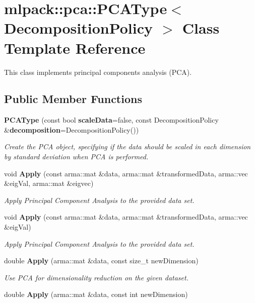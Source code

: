 \section{mlpack\+:\+:pca\+:\+:P\+C\+A\+Type$<$ Decomposition\+Policy $>$ Class Template Reference}
\label{classmlpack_1_1pca_1_1PCAType}


This class implements principal components analysis (P\+CA).  


\subsection*{Public Member Functions}
\begin{DoxyCompactItemize}
\item 
{\bf P\+C\+A\+Type} (const bool {\bf scale\+Data}=false, const Decomposition\+Policy \&{\bf decomposition}=Decomposition\+Policy())
\begin{DoxyCompactList}\small\item\em Create the P\+CA object, specifying if the data should be scaled in each dimension by standard deviation when P\+CA is performed. \end{DoxyCompactList}\item 
void {\bf Apply} (const arma\+::mat \&data, arma\+::mat \&transformed\+Data, arma\+::vec \&eig\+Val, arma\+::mat \&eigvec)
\begin{DoxyCompactList}\small\item\em Apply Principal Component Analysis to the provided data set. \end{DoxyCompactList}\item 
void {\bf Apply} (const arma\+::mat \&data, arma\+::mat \&transformed\+Data, arma\+::vec \&eig\+Val)
\begin{DoxyCompactList}\small\item\em Apply Principal Component Analysis to the provided data set. \end{DoxyCompactList}\item 
double {\bf Apply} (arma\+::mat \&data, const size\+\_\+t new\+Dimension)
\begin{DoxyCompactList}\small\item\em Use P\+CA for dimensionality reduction on the given dataset. \end{DoxyCompactList}\item 
double {\bf Apply} (arma\+::mat \&data, const int new\+Dimension)

\end{DoxyCompactItemize}
